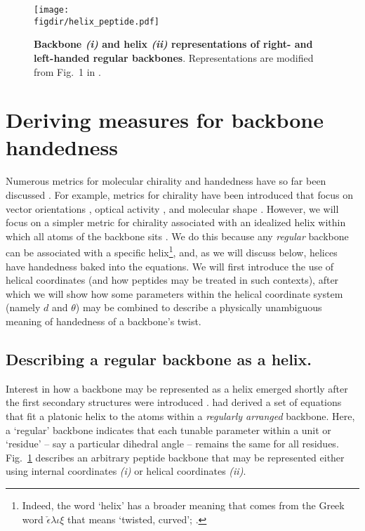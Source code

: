 \documentclass[fleqn,10pt]{wlpeerj} %
\newcommand{\Fig}[1]{Fig.~\ref{#1}}
\newcommand{\figdir}{./figures}
\begin{document}
\begin{figure}[t!]
  \centering
  \texttt{[image: \\figdir/helix\_peptide.pdf]}
  \caption{{\bf Backbone \textit{(i)} and helix \textit{(ii)} representations of right- and left-handed regular backbones}.  Representations are modified from Fig.~1 in \citep{Shimanouchi1955}.
\label{fig:helix}}
\end{figure}

\section*{Deriving measures for backbone handedness}
Numerous metrics for molecular chirality and handedness have so far been discussed \citep{Harris1999}. For example, metrics for chirality have been introduced that focus on vector orientations \citep{Kwiecinska2005,Gruziel2013}, optical activity \citep{Osipov1995}, and molecular shape \citep{Ferrarini1998}. However, we will focus on a simpler metric for chirality associated with an idealized helix within which all atoms of the backbone sits \citep{Shimanouchi1955,Miyazawa1961,Zacharias2013}. We do this because any {\em regular} backbone can be associated with a specific helix\footnote{Indeed, the word `helix' has a broader meaning that comes from the Greek word $\check\epsilon\lambda\iota\xi$ that means `twisted, curved'; \cite{Liddell1894}.}, and, as we will discuss below, helices have handedness baked into the equations. We will first introduce the use of helical coordinates (and how peptides may be treated in such contexts), after which we will show how some parameters within the helical coordinate system (namely $d$ and $\theta$) may be combined to describe a physically unambiguous meaning of handedness of a backbone's twist.

\subsection*{Describing a regular backbone as a helix.} Interest in how a backbone may be represented as a helix emerged shortly after the first secondary structures were introduced \citep{Pauling1951,Pauling1951a,Pauling1951b}. \cite{Shimanouchi1955} had derived a set of equations that fit a platonic helix to the atoms within a {\it regularly arranged} backbone. Here, a `regular' backbone  indicates that each tunable parameter within a unit or `residue' -- say a particular dihedral angle -- remains the same for all residues. \Fig{fig:helix} describes an arbitrary peptide backbone that may be represented either using internal coordinates \textit{(i)} or helical coordinates \textit{(ii)}. 
\end{document}
